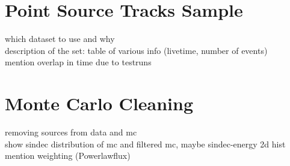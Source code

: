 \section{Point Source Tracks Sample}
which dataset to use and why\\
description of the set: table of various info (livetime, number of events)\\
mention overlap in time due to testruns\\

\section{Monte Carlo Cleaning}
removing sources from data and mc\\
show sindec distribution of mc and filtered mc, maybe sindec-energy 2d hist\\
mention weighting (Powerlawflux)\\
